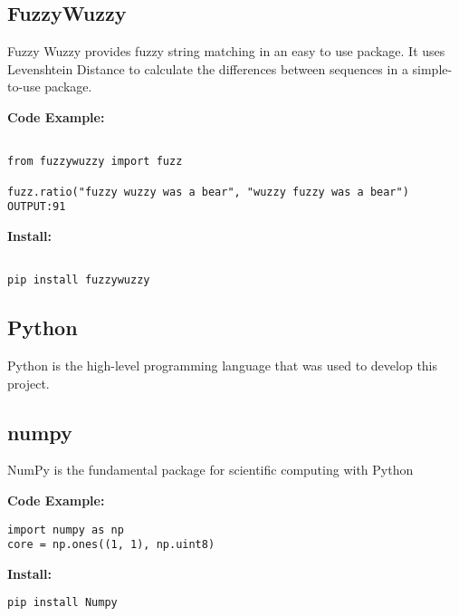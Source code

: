 \subsection{FuzzyWuzzy}

Fuzzy Wuzzy provides fuzzy string matching in an easy to use package.
It uses Levenshtein Distance to calculate the differences between sequences
in a simple-to-use package\cite{hid-sp18-414-www-fuzzywuzzy}.


\bigskip
\noindent
\textbf{Code Example:}
\begin{footnotesize}
\begin{verbatim}

from fuzzywuzzy import fuzz

fuzz.ratio("fuzzy wuzzy was a bear", "wuzzy fuzzy was a bear")
OUTPUT:91

\end{verbatim}
\end{footnotesize}
\noindent
\textbf{Install:}
\begin{footnotesize}
\begin{verbatim}

pip install fuzzywuzzy
\end{verbatim}
\end{footnotesize}

\subsection{Python}

Python is the high-level programming language that was used to develop
this project.

\subsection{numpy}

NumPy is the fundamental package for scientific computing with Python\cite{hid-sp18-414-www-NumPy} 

\bigskip
\noindent
\textbf{Code Example:}
\begin{footnotesize}
\begin{verbatim}
import numpy as np
core = np.ones((1, 1), np.uint8)
\end{verbatim}
\end{footnotesize}
\noindent
\textbf{Install:}
\begin{footnotesize}
\begin{verbatim}
pip install Numpy
\end{verbatim}
\end{footnotesize}

